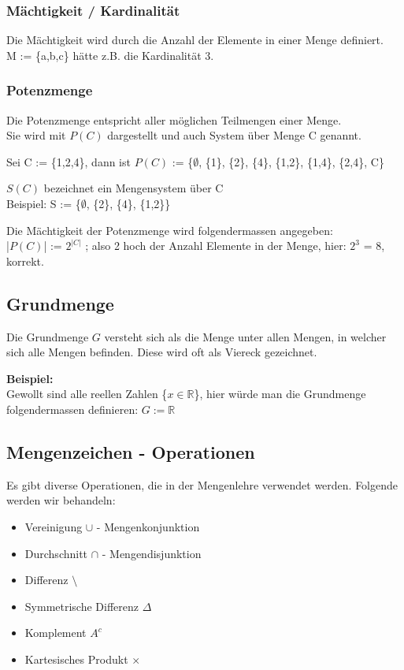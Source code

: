 \documentclass[a4paper,12pt]{article}
\begin{document}
\subsubsection{Mächtigkeit / Kardinalität}
Die Mächtigkeit wird durch die Anzahl der Elemente in einer Menge definiert. \\
M := \{a,b,c\} hätte z.B. die Kardinalität 3.

\subsubsection{Potenzmenge}
Die Potenzmenge entspricht aller möglichen Teilmengen einer Menge. \\
Sie wird mit \( P(C) \) dargestellt und auch System über Menge C genannt.

Sei C := \{1,2,4\}, dann ist \( P(C) \) := \{$\emptyset$,  \{1\}, \{2\}, \{4\}, \{1,2\}, \{1,4\}, \{2,4\}, C\}

\( S(C) \) bezeichnet ein Mengensystem über C \\
Beispiel: S := \{$\emptyset$,  \{2\}, \{4\}, \{1,2\}\}

Die Mächtigkeit der Potenzmenge wird folgendermassen angegeben: \\
|\( P(C) \)| := $2^{|C|}$ ; also 2 hoch der Anzahl Elemente in der Menge, hier: $2^{3}$ = 8, korrekt.

\subsection{Grundmenge}
Die Grundmenge $G$ versteht sich als die Menge unter allen Mengen, in welcher sich alle Mengen befinden. Diese wird oft als Viereck gezeichnet.

\textbf{Beispiel:} \\
Gewollt sind alle reellen Zahlen \{$x \in \mathbb{R}$\}, hier würde man die Grundmenge folgendermassen definieren: $G := \mathbb{R}$

\subsection{Mengenzeichen - Operationen}
Es gibt diverse Operationen, die in der Mengenlehre verwendet werden. Folgende werden wir behandeln:
\begin{itemize}
  \item Vereinigung $\cup$ - Mengenkonjunktion
  \item Durchschnitt $\cap$ - Mengendisjunktion
  \item Differenz $\setminus$
  \item Symmetrische Differenz $\Delta$
  \item Komplement $A^{c}$
  \item Kartesisches Produkt $\times$
\end{itemize}
\end{document}
